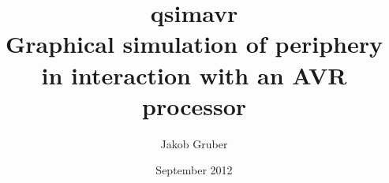 
\title{qsimavr \\ Graphical simulation of periphery in interaction with an AVR processor}
\author{Jakob Gruber}
\address{Kirschenallee 6/1, A-2120 Obersdorf}
\date{September 2012}


